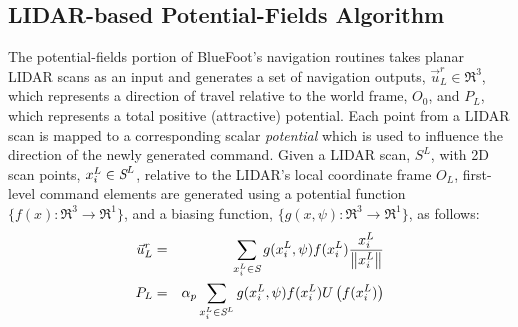 		\subsection{LIDAR-based Potential-Fields Algorithm}

			The potential-fields portion of BlueFoot's navigation routines takes planar LIDAR scans as an input and generates a set of navigation outputs, $\vec{u}^{r}_{L} \in \Re^{3}$, which represents a direction of travel relative to the world frame, $O_{0}$, and $P_{L}$, which represents a total positive (attractive) potential. Each point from a LIDAR scan is mapped to a corresponding scalar \emph{potential} which is used to influence the direction of the newly generated command. Given a LIDAR scan, $S^{L}$, with 2D scan points, $x_{i}^{L}\in\emph{S}^{L}$, relative to the LIDAR's local coordinate frame $O_{L}$, first-level command elements are generated using a potential function $\{ f(x) : \Re^{3}\rightarrow \Re^{1} \}$, and a biasing function, $\{ g(x,\psi) : \Re^{3}\rightarrow \Re^{1} \}$, as follows:
				\begin{eqnarray}
					\vec{u}^{r}_{L} &=&  { \sum_{x_{i}^{L} \in \emph{S}} g( x_{i}^{L},\psi)  f( x_{i}^{L} ) \frac{x_{i}^{L}}{\left\lVert x_{i}^{L}\right\rVert} } \nonumber \\
					P_{L} & = & \alpha_{p}\sum_{x_{i}^{L} \in \emph{S}^{L}} g( x_{i}^{L},\psi)  f( x_{i}^{L} ) U\left(f( x_{i}^{L} )\right)
					\label{eq::full_potential_fields}
				\end{eqnarray}

